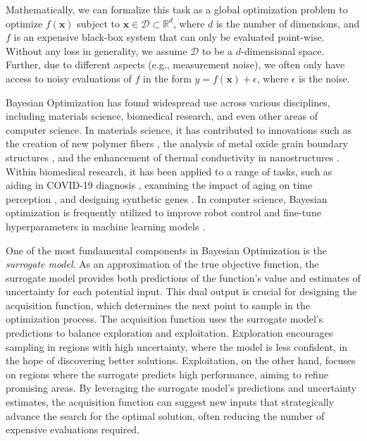 Mathematically, we can formalize this task as a global optimization problem to optimize $f(\mathbf{x})$ subject to $\mathbf{x} \in \mathcal D \subset \mathbb{R}^d$, where $d$ is the number of dimensions, and $f$ is an expensive black-box system that can only be evaluated point-wise. Without any loss in generality, we assume  $\mathcal D$ to be a $d$-dimensional space. Further, due to different aspects (e.g., measurement noise), we often only have access to noisy evaluations of $f$ in the form $y = f(\mathbf{x}) + \epsilon$, where $\epsilon$ is the noise.

Bayesian Optimization has found widespread use across various disciplines, including materials science, biomedical research, and even other areas of computer science. In materials science, it has contributed to innovations such as the creation of new polymer fibers \citep{li2017rapid}, the analysis of metal oxide grain boundary structures \citep{kikuchi2018bayesian}, and the enhancement of thermal conductivity in nanostructures \citep{ju2017designing}. Within biomedical research, it has been applied to a range of tasks, such as aiding in COVID-19 diagnosis \citep{nour2020novel}, examining the impact of aging on time perception \citep{turgeon2016cognitive}, and designing synthetic genes \citep{gonzalez2015bayesian}. In computer science, Bayesian optimization is frequently utilized to improve robot control \citep{berkenkamp2023bayesian} and fine-tune hyperparameters in machine learning models \citep{snoek2012practical,bergstra2012random}.

One of the most fundamental components in Bayesian Optimization is the \textit{surrogate model}. As an approximation of the true objective function, the surrogate model provides both predictions of the function’s value and estimates of uncertainty for each potential input. This dual output is crucial for designing the acquisition function, which determines the next point to sample in the optimization process. The acquisition function uses the surrogate model's predictions to balance exploration and exploitation. Exploration encourages sampling in regions with high uncertainty, where the model is less confident, in the hope of discovering better solutions. Exploitation, on the other hand, focuses on regions where the surrogate predicts high performance, aiming to refine promising areas. By leveraging the surrogate model’s predictions and uncertainty estimates, the acquisition function can suggest new inputs that strategically advance the search for the optimal solution, often reducing the number of expensive evaluations required.

